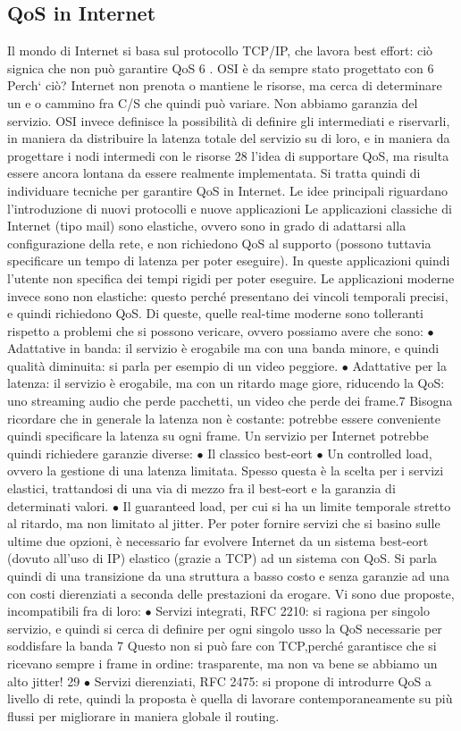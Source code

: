 \subsection{QoS in Internet}
Il mondo di Internet si basa sul protocollo TCP/IP, che lavora best effort: ciò
signica che non può garantire QoS 6 . OSI è da sempre stato progettato con
6 Perch` ciò? Internet non prenota o mantiene le risorse, ma cerca di determinare un
e o
cammino fra C/S che quindi può variare. Non abbiamo garanzia del servizio. OSI invece
definisce la possibilità di definire gli intermediati e riservarli, in maniera da distribuire la
latenza totale del servizio su di loro, e in maniera da progettare i nodi intermedi con le risorse
28
l'idea di supportare QoS, ma risulta essere ancora lontana da essere realmente
implementata. Si tratta quindi di individuare tecniche per garantire QoS in Internet. Le idee principali riguardano
l'introduzione di nuovi protocolli e nuove
applicazioni
Le applicazioni classiche di Internet (tipo mail) sono elastiche, ovvero sono
in grado di adattarsi alla configurazione della rete, e non richiedono QoS al
supporto (possono tuttavia specificare un tempo di latenza per poter eseguire).
In queste applicazioni quindi l'utente non specifica dei tempi rigidi per poter
eseguire.
Le applicazioni moderne invece sono non elastiche: questo perché presentano
dei vincoli temporali precisi, e quindi richiedono QoS. Di queste, quelle real-time
moderne sono tolleranti rispetto a problemi che si possono vericare, ovvero
possiamo avere che sono:
$\bullet$ Adattative in banda: il servizio è erogabile ma con una banda minore, e
quindi qualità diminuita: si parla per esempio di un video peggiore.
$\bullet$ Adattative per la latenza: il servizio è erogabile, ma con un ritardo mage
giore, riducendo la QoS: uno streaming audio che perde pacchetti, un video
che perde dei frame.7
Bisogna ricordare che in generale la latenza non è costante: potrebbe essere
conveniente quindi specificare la latenza su ogni frame.
Un servizio per Internet potrebbe quindi richiedere garanzie diverse:
$\bullet$ Il classico best-eort
$\bullet$ Un controlled load, ovvero la gestione di una latenza limitata. Spesso
questa è la scelta per i servizi elastici, trattandosi di una via di mezzo fra
il best-eort e la garanzia di determinati valori.
$\bullet$ Il guaranteed load, per cui si ha un limite temporale stretto al ritardo, ma
non limitato al jitter.
Per poter fornire servizi che si basino sulle ultime due opzioni, è necessario
far evolvere Internet da un sistema best-eort (dovuto all'uso di IP) elastico
(grazie a TCP) ad un sistema con QoS. Si parla quindi di una transizione da
una struttura a basso costo e senza garanzie ad una con costi dierenziati a
seconda delle prestazioni da erogare. Vi sono due proposte, incompatibili fra di
loro:
$\bullet$ Servizi integrati, RFC 2210: si ragiona per singolo servizio, e quindi si
cerca di definire per ogni singolo usso la QoS
necessarie per soddisfare la banda
7 Questo non si può fare con TCP,perché garantisce che si ricevano sempre i frame in ordine:
trasparente, ma non va bene se abbiamo un alto jitter!
29
$\bullet$ Servizi dierenziati, RFC 2475: si propone di introdurre QoS a livello di
rete, quindi la proposta è quella di lavorare contemporaneamente su più
flussi per migliorare in maniera globale il routing.
